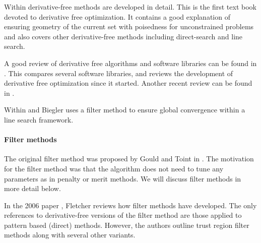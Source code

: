 \documentclass{article}
\begin{document}
Within  \cite{DUMMY:intro_book} derivative-free methods are developed in detail.
This is the first text book devoted to derivative free optimization.
It contains a good explanation of ensuring geometry of the current set with poisedness for unconstrained problems and also covers other derivative-free methods including direct-search and line search.

A good review of derivative free algorithms and software libraries can be found in \cite{DUMMY:review}.
This compares several software libraries, and reviews the development of derivative free optimization since it started.
Another recent review can be found in \cite{DUMMY:review2}.

Within \cite{DUMMY:linesearch_global} and \cite{DUMMY:linesearch_local} Biegler uses a filter method to ensure global convergence within a line search framework.


\paragraph{Filter methods}

The original filter method was proposed by Gould and Toint in \cite{DUMMY:original_filter}.
The motivation for the filter method was that the algorithm does not need to tune any parameters as in penalty or merit methods.
We will discuss filter methods in more detail below.


In the 2006 paper \cite{DUMMY:Fletcher}, Fletcher reviews how filter methods have developed.
The only references to derivative-free versions of the filter method are those applied to pattern based (direct) methods.
However, the authors outline trust region filter methods along with several other variants.

\end{document}
